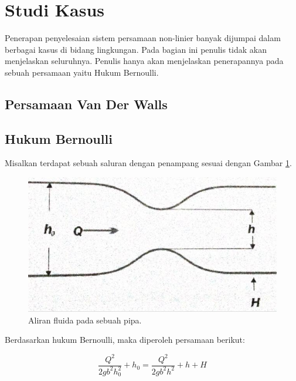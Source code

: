 \documentclass[
]{book}
\theoremstyle{definition}
\theoremstyle{definition}
\theoremstyle{definition}
\theoremstyle{definition}
\theoremstyle{remark}
\begin{document}
\hypertarget{studi-kasus}{%
\section{Studi Kasus}\label{studi-kasus}}

Penerapan penyelesaian sistem persamaan non-linier banyak dijumpai dalam berbagai kasus di bidang lingkungan. Pada bagian ini penulis tidak akan menjelaskan seluruhnya. Penulis hanya akan menjelaskan penerapannya pada sebuah persamaan yaitu Hukum Bernoulli.

\hypertarget{persamaan-van-der-walls}{%
\subsection{Persamaan Van Der Walls}\label{persamaan-van-der-walls}}

\hypertarget{hukum-bernoulli}{%
\subsection{Hukum Bernoulli}\label{hukum-bernoulli}}

Misalkan terdapat sebuah saluran dengan penampang sesuai dengan Gambar \ref{fig:bernoulli}.

\begin{figure}

{\centering \includegraphics[width=0.8\linewidth]{./images/bernoulli} 

}

\caption{Aliran fluida pada sebuah pipa.}\label{fig:bernoulli}
\end{figure}

Berdasarkan hukum Bernoulli, maka diperoleh persamaan berikut:

\begin{equation}
\frac{Q^2}{2gb^2h_0^2}+h_0=\frac{Q^2}{2gb^2h^2}+h+H
  \label{eq:bernoullieq}
\end{equation}
\end{document}
